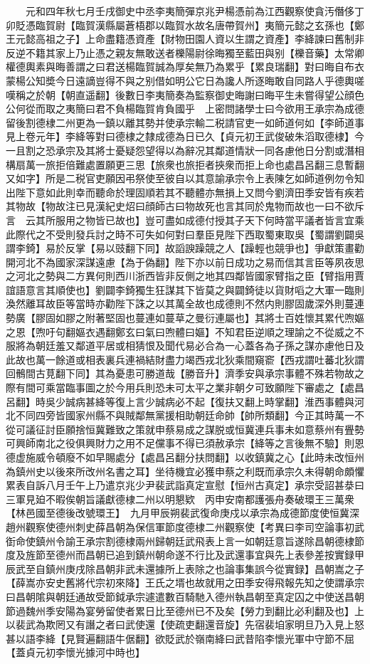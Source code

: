 　　元和四年秋七月壬戌御史中丞李夷簡彈京兆尹楊憑前為江西觀察使貪汚僭侈丁卯貶憑臨賀尉【臨賀漢縣屬蒼梧郡以臨賀水故名唐帶賀州】夷簡元懿之玄孫也【鄭王元懿高祖之子】上命盡籍憑資產【財物田園人資以生謂之資產】李絳諫曰舊制非反逆不籍其家上乃止憑之親友無敢送者櫟陽尉徐晦獨至藍田與别【櫟音藥】太常卿權德輿素與晦善謂之曰君送楊臨賀誠為厚矣無乃為累乎【累良瑞翻】對曰晦自布衣蒙楊公知奬今日遠謫豈得不與之别借如明公它日為讒人所逐晦敢自同路人乎德輿嗟嘆稱之於朝【朝直遥翻】後數日李夷簡奏為監察御史晦謝曰晦平生未嘗得望公顔色公何從而取之夷簡曰君不負楊臨賀肯負國乎　上密問諸學士曰今欲用王承宗為成德留後割德棣二州更為一鎮以離其勢并使承宗輸二税請官吏一如師道何如【李師道事見上卷元年】李絳等對曰德棣之隸成德為日已久【貞元初王武俊破朱滔取德棣】今一且割之恐承宗及其將士憂疑怨望得以為辭况其鄰道情狀一同各慮他日分割或潛相構扇萬一旅拒倍難處置願更三思【旅衆也旅拒者挾衆而拒上命也處昌呂翻三息暫翻又如字】所是二税官吏願因弔祭使至彼自以其意諭承宗令上表陳乞如師道例勿令知出陛下意如此則幸而聽命於理固順若其不聽體亦無損上又問今劉濟田季安皆有疾若其物故【物故注已見漢紀史炤曰顔師古曰物故死也言其同於鬼物而故也一曰不欲斥言　云其所服用之物皆已故也】豈可盡如成德付授其子天下何時當平議者皆言宜乘此際代之不受則發兵討之時不可失如何對曰羣臣見陛下西取蜀東取吳【蜀謂劉闢吳謂李錡】易於反掌【易以豉翻下同】故謟諛躁競之人【躁輕也競爭也】爭獻策畫勸開河北不為國家深謀遠慮【為于偽翻】陛下亦以前日成功之易而信其言臣等夙夜思之河北之勢與二方異何則西川浙西皆非反側之地其四鄰皆國家臂指之臣【臂指用賈誼語意言其順使也】劉闢李錡獨生狂謀其下皆莫之與闢錡徒以貨財㗖之大軍一臨則渙然離耳故臣等當時亦勸陛下誅之以其萬全故也成德則不然内則膠固歲深外則蔓連勢廣【膠固如膠之附著堅固也蔓連如蔓草之曼衍連屬也】其將士百姓懷其累代喣嫗之恩【喣吁句翻嫗衣遇翻鄭玄曰氣曰喣體曰嫗】不知君臣逆順之理諭之不從威之不服將為朝廷羞又鄰道平居或相猜恨及聞代易必合為一心蓋各為子孫之謀亦慮他日及此故也萬一餘道或相表裏兵連禍結財盡力竭西戎北狄乘間窺窬【西戎謂吐蕃北狄謂回鶻間古莧翻下同】其為憂患可勝道哉【勝音升】濟季安與承宗事體不殊若物故之際有間可乘當臨事圖之於今用兵則恐未可太平之業非朝夕可致願陛下審處之【處昌呂翻】時吳少誠病甚絳等復上言少誠病必不起【復扶又翻上時掌翻】淮西事體與河北不同四旁皆國家州縣不與賊鄰無黨援相助朝廷命帥【帥所類翻】今正其時萬一不從可議征討臣願捨恒冀難致之策就申蔡易成之謀脱或恒冀連兵事未如意蔡州有舋勢可興師南北之役俱興財力之用不足儻事不得已須赦承宗【絳等之言後無不驗】則恩德虚施威令頓廢不如早賜處分【處昌呂翻分扶問翻】以收鎮冀之心【此時未改恒州為鎮州史以後來所改州名書之耳】坐待機宜必獲申蔡之利既而承宗久未得朝命頗懼累表自訴八月壬午上乃遣京兆少尹裴武詣真定宣慰【恒州古真定】承宗受詔甚㳟曰三軍見廹不暇俟朝旨議獻德棣二州以明懇欵　丙申安南都護張舟奏破環王三萬衆【林邑國至德後改號環王】　九月甲辰朔裴武復命庚戍以承宗為成德節度使恒冀深趙州觀察使德州刺史薛昌朝為保信軍節度德棣二州觀察使【考異曰李司空論事初武衘命使鎮州令諭王承宗割德棣兩州歸朝廷武飛表上言一如朝廷意旨遂除昌朝德棣節度及旌節至德州而昌朝已追到鎮州朝命遂不行比及武還事宜與先上表參差按實録甲辰武至自鎮州庚戌除昌朝非武未還據所上表除之也論事集誤今從實録】昌朝嵩之子【薛嵩亦安史舊將代宗初來降】王氏之壻也故就用之田季安得飛報先知之使謂承宗曰昌朝隂與朝廷通故受節鉞承宗遽遣數百騎馳入德州執昌朝至真定囚之中使送昌朝節過魏州季安陽為宴勞留使者累日比至德州已不及矣【勞力到翻比必利翻及也】上以裴武為欺罔又有譖之者曰武使還【使疏吏翻還音旋】先宿裴垍家明旦乃入見上怒甚以語李絳【見賢遍翻語牛倨翻】欲貶武於嶺南絳曰武昔陷李懷光軍中守節不屈【蓋貞元初李懷光據河中時也】
